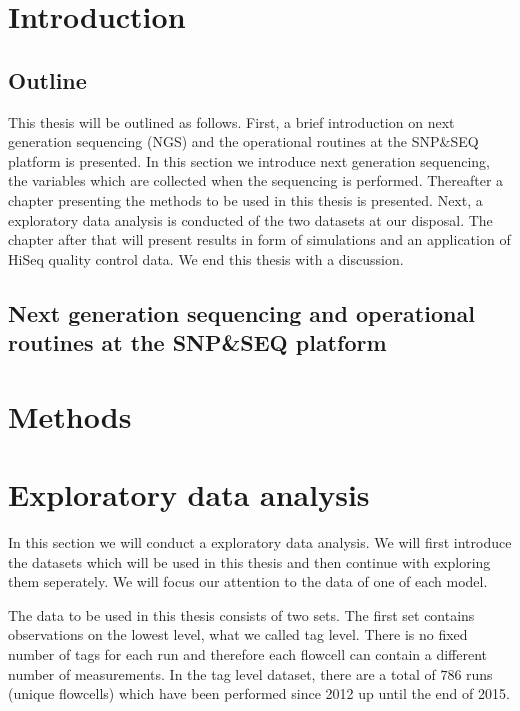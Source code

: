 \documentclass[a4paper,11pt,fleqn,twoside,notitlepage]{report}\usepackage[]{graphicx}\usepackage[]{color}
\begin{document}
\chapter{Introduction}

\section{Outline}
This thesis will be outlined as follows. First, a brief introduction on next generation sequencing (NGS) and the operational routines at the SNP\&SEQ platform is presented. In this section we introduce next generation sequencing, the variables which are collected when the sequencing is performed. Thereafter a chapter presenting the methods to be used in this thesis is presented. Next, a exploratory data analysis is conducted of the two datasets at our disposal. The chapter after that will present results in form of simulations and an application of HiSeq quality control data. We end this thesis with a discussion.
\section{Next generation sequencing and operational routines at the SNP\&SEQ platform}


\chapter{Methods}


\chapter{Exploratory data analysis}





In this section we will conduct a exploratory data analysis. We will first introduce the datasets which will be used in this thesis and then continue with exploring them seperately. We will focus our attention to the data of one of each model. 

The data to be used in this thesis consists of two sets. The first set contains observations on the lowest level, what we called tag level. There is no fixed number of tags for each run and therefore each flowcell can contain a different number of measurements. In the tag level dataset, there are a total of $786$ runs (unique flowcells) which have been performed since 2012 up until the end of 2015. 
\end{document}
